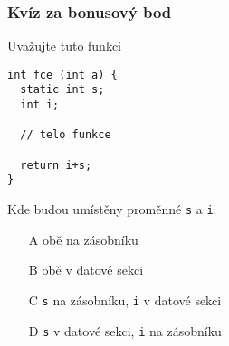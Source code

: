 \documentclass{beamer}
\begin{document}
\begin{frame}[fragile]
\frametitle{Kvíz za bonusový bod}

Uvažujte tuto funkci
\begin{verbatim}
int fce (int a) {
  static int s;
  int i;
  
  // telo funkce
  
  return i+s;
}
\end{verbatim}
Kde budou umístěny proměnné \texttt{s} a \texttt{i}:
\begin{itemize}
 \item[A] obě na zásobníku
 \item[B] obě v datové sekci
 \item[C] \texttt{s} na zásobníku, \texttt{i} v datové sekci
 \item[D] \texttt{s} v datové sekci, \texttt{i} na zásobníku
\end{itemize}
\end{frame}
\end{document}
